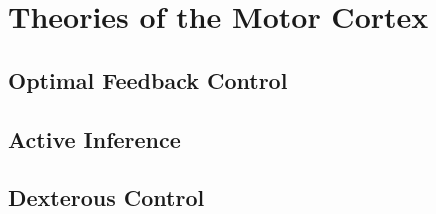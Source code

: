 \section{Theories of the Motor Cortex}

\subsection{Optimal Feedback Control}

\subsection{Active Inference}

\subsection{Dexterous Control}
